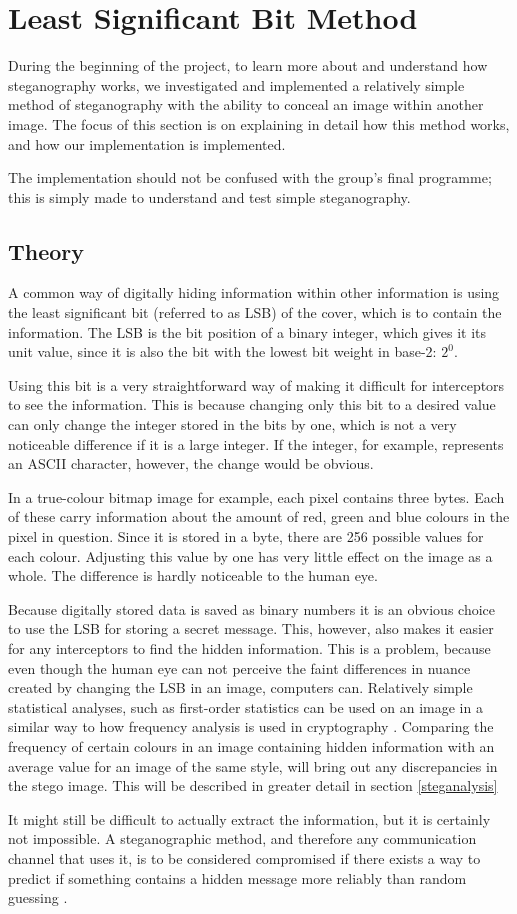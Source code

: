 \section{Least Significant Bit Method}
During the beginning of the project, to learn more about and understand how steganography works, we investigated and implemented a relatively simple method of steganography with the ability to conceal an image within another image.
The focus of this section is on explaining in detail how this method works, and how our implementation is implemented.

The implementation should not be confused with the group's final programme; this is simply made to understand and test simple steganography.

\subsection{Theory}
A common way of digitally hiding information within other information is using the least significant bit (referred to as LSB) of the cover, which is to contain the information.
The LSB is the bit position of a binary integer, which gives it its unit value, since it is also the bit with the lowest bit weight in base-2: $2^0$.

Using this bit is a very straightforward way of making it difficult for interceptors to see the information.
This is because changing only this bit to a desired value can only change the integer stored in the bits by one, which is not a very noticeable difference if it is a large integer.
If the integer, for example, represents an ASCII character, however, the change would be obvious.

In a true-colour bitmap image for example, each pixel contains three bytes.
Each of these carry information about the amount of red, green and blue colours in the pixel in question.
Since it is stored in a byte, there are 256 possible values for each colour.
Adjusting this value by one has very little effect on the image as a whole.
The difference is hardly noticeable to the human eye.

Because digitally stored data is saved as binary numbers it is an obvious choice to use the LSB for storing a secret message.
This, however, also makes it easier for any interceptors to find the hidden information.
This is a problem, because even though the human eye can not perceive the faint differences in nuance created by changing the LSB in an image, computers can.
Relatively simple statistical analyses, such as first-order statistics can be used on an image in a similar way to how frequency analysis is used in cryptography \citep{Hetzl2005}.
Comparing the frequency of certain colours in an image containing hidden information with an average value for an image of the same style, will bring out any discrepancies in the stego image.
This will be described in greater detail in section \ref{steganalysis}

It might still be difficult to actually extract the information, but it is certainly not impossible.
A steganographic method, and therefore any communication channel that uses it, is to be considered compromised if there exists a way to predict if something contains a hidden message more reliably than random guessing \citep{Bohme2004}.
